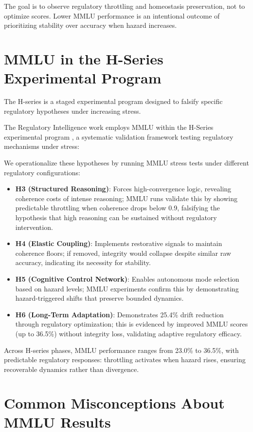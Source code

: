 \documentclass[12pt,a4paper]{article}
\begin{document}
The goal is to observe regulatory throttling and homeostasis preservation, not to optimize scores. Lower MMLU performance is an intentional outcome of prioritizing stability over accuracy when hazard increases.

\section{MMLU in the H-Series Experimental Program}

The H-series is a staged experimental program designed to falsify specific regulatory hypotheses under increasing stress.

The Regulatory Intelligence work employs MMLU within the H-Series experimental program \cite{Cragin2026RI}, a systematic validation framework testing regulatory mechanisms under stress:

We operationalize these hypotheses by running MMLU stress tests under different regulatory configurations:

\begin{itemize}
\item \textbf{H3 (Structured Reasoning)}: Forces high-convergence logic, revealing coherence costs of intense reasoning; MMLU runs validate this by showing predictable throttling when coherence drops below 0.9, falsifying the hypothesis that high reasoning can be sustained without regulatory intervention.
\item \textbf{H4 (Elastic Coupling)}: Implements restorative signals to maintain coherence floors; if removed, integrity would collapse despite similar raw accuracy, indicating its necessity for stability.
\item \textbf{H5 (Cognitive Control Network)}: Enables autonomous mode selection based on hazard levels; MMLU experiments confirm this by demonstrating hazard-triggered shifts that preserve bounded dynamics.
\item \textbf{H6 (Long-Term Adaptation)}: Demonstrates 25.4\% drift reduction through regulatory optimization; this is evidenced by improved MMLU scores (up to 36.5\%) without integrity loss, validating adaptive regulatory efficacy.
\end{itemize}

Across H-series phases, MMLU performance ranges from 23.0\% to 36.5\%, with predictable regulatory responses: throttling activates when hazard rises, ensuring recoverable dynamics rather than divergence.

\section{Common Misconceptions About MMLU Results}
\end{document}
